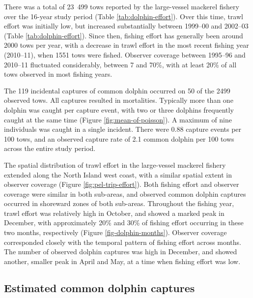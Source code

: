 \documentclass[10pt]{article}
\begin{document}
There was a total of 23~499 tows reported by the large-vessel mackerel fishery over the 16-year study period (Table \ref{tab:dolphin-effort}).  Over this time, trawl effort was initially low, but increased substantially between \mbox{1999--00} and \mbox{2002--03} (Table \ref{tab:dolphin-effort}). Since then, fishing effort has generally been around 2000 tows per year, with a decrease in trawl effort in the most recent fishing year (\mbox{2010--11}), when 1551 tows were fished. Observer coverage between \mbox{1995--96} and \mbox{2010--11} fluctuated considerably, between 7 and 70\%, with at least 20\% of all tows observed in most fishing years. 

The 119 incidental captures of common dolphin occurred on 50 of the 2499 observed
tows.  All captures resulted in mortalities.  Typically more than one
dolphin was caught per capture event, with two or three dolphins
frequently caught at the same time (Figure \ref{fig:mean-of-poisson}).
A maximum of nine individuals was caught in a single incident.  There were 0.88 capture events per 100 tows, and an observed capture rate of 2.1 common dolphin per 100 tows across the entire study period.

The spatial distribution of trawl effort in the large-vessel mackerel fishery extended along the North Island west coast, with a similar spatial extent in observer coverage (Figure \ref{fig:pel-trip-effort}). Both fishing effort and observer coverage were similar in both sub-areas, and observed common dolphin captures occurred in shoreward zones of both sub-areas.  Throughout the fishing year, trawl effort was relatively high in October, and showed a marked peak in December, with approximately 20\% and 30\% of fishing effort occurring in these two months, respectively (Figure \ref{fig-dolphin-months}). Observer coverage corresponded closely with the temporal pattern of fishing effort across months.  The number of observed dolphin captures was high in December, and showed another, smaller peak in April and May, at a time when fishing effort was low.    

\subsection*{Estimated common dolphin captures}
\end{document}
